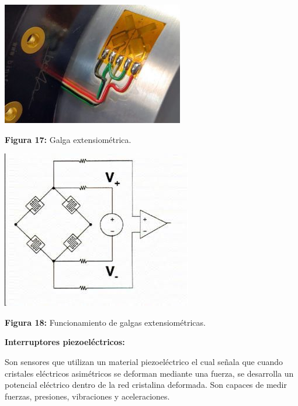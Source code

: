 \vspace{5mm}

\begin{center}
	\includegraphics[width=0.3\linewidth, height=0.2\textheight]{img/galga-extensiometrica-300x202}
	
	\vspace{2mm} %
	
	\textbf{Figura 17:} Galga extensiométrica.
\end{center}

\vspace{5mm} %

\begin{center}
	\includegraphics[width=0.5\linewidth]{img/Sgalgas}
	
	\vspace{2mm} %
	
	\textbf{Figura 18:} Funcionamiento de galgas extensiométricas.
\end{center}

\vspace{10mm}
\textbf{Interruptores piezoeléctricos:}

Son sensores que utilizan un material piezoeléctrico el cual señala que cuando cristales eléctricos asimétricos se deforman mediante una fuerza, se desarrolla un potencial eléctrico dentro de la red cristalina deformada. Son capaces de medir fuerzas, presiones, vibraciones y aceleraciones.


\vspace{5mm}

